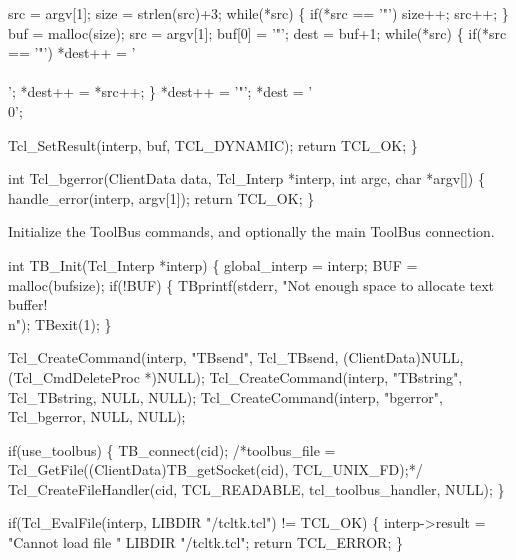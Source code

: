   src = argv[1];
  size = strlen(src)+3;
  while(*src) \{
    if(*src == '"')
      size++;
    src++;
  \}
  buf = malloc(size);
  src = argv[1];
  buf[0] = '"';
  dest = buf+1;
  while(*src) \{
    if(*src == '"')
      *dest++ = '\\\\';
    *dest++ = *src++;
  \}
  *dest++ = '"';
  *dest = '\\0';
  
  Tcl_SetResult(interp, buf, TCL_DYNAMIC);
  return TCL_OK;
\}
\nwendcode{}\nwdocspar


\nwenddocs{}\endmoddef\let\nwnotused=\nwoutput{}
int Tcl_bgerror(ClientData data, Tcl_Interp *interp, int argc, char *argv[])
\{
  handle_error(interp, argv[1]);
  return TCL_OK;
\}
\nwendcode{}\nwdocspar



Initialize the ToolBus commands, and optionally the main ToolBus
connection.

\nwenddocs{}\endmoddef\let\nwnotused=\nwoutput{}
int TB_Init(Tcl_Interp *interp)
\{
  global_interp = interp;
  BUF = malloc(bufsize);
  if(!BUF) \{
    TBprintf(stderr, "Not enough space to allocate text buffer!\\n");
    TBexit(1);
  \}

  Tcl_CreateCommand(interp, "TBsend", Tcl_TBsend, (ClientData)NULL, (Tcl_CmdDeleteProc *)NULL);
  Tcl_CreateCommand(interp, "TBstring", Tcl_TBstring, NULL, NULL);
  Tcl_CreateCommand(interp, "bgerror", Tcl_bgerror, NULL, NULL);

  if(use_toolbus) \{
    TB_connect(cid);
    /*toolbus_file = Tcl_GetFile((ClientData)TB_getSocket(cid), TCL_UNIX_FD);*/
    Tcl_CreateFileHandler(cid, TCL_READABLE, tcl_toolbus_handler, NULL);
  \}

  if(Tcl_EvalFile(interp, LIBDIR "/tcltk.tcl") != TCL_OK) \{
    interp->result = "Cannot load file " LIBDIR "/tcltk.tcl";
    return TCL_ERROR;
  \}

